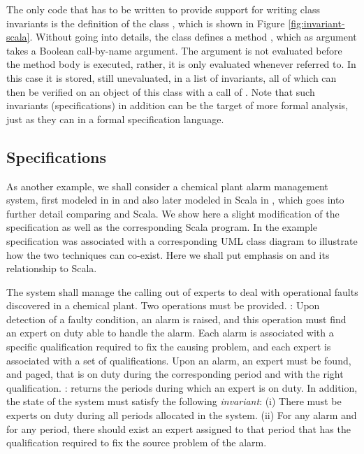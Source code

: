 The only code that has to be written to provide support for 
writing
class invariants is the definition of the class , 
which is shown in Figure \ref{fig:invariant-scala}. Without going 
into details, the class defines a method ,
which as argument takes a Boolean call-by-name argument. 
The argument is not evaluated before the method body is executed, 
rather, it is only evaluated whenever referred to. In this case
it is stored, still unevaluated, in a list of invariants, all
of which can then be verified on an object of this class 
with a call of . Note that such invariants
(specifications) in addition can be the target of more formal analysis, just as they can in a formal specification language.


\subsection{\vdmpp{} Specifications}
\label{sec:vdm-in-scala}

As another example, we shall consider a chemical plant alarm 
management system, first modeled in \vdmpp{} in 
\cite{vdmplusplus05} and also later modeled in Scala in 
\cite{havelund-scala-vdm-12}, which goes into further detail comparing \vdmpp{} and Scala. We show here a slight modification of 
the \vdmpp{} specification as well as the 
corresponding Scala program. In \cite{vdmplusplus05}
the example specification was associated with 
a corresponding UML class diagram to illustrate how the two
techniques can co-exist. Here we shall put emphasis on
\vdmpp{} and its relationship to Scala.

The system shall manage the calling out of experts to deal with 
operational faults discovered in a 
chemical plant. 
Two operations must be provided.
: Upon detection of a faulty condition, an 
alarm is raised, and this operation must find an expert on duty 
able to handle the alarm. Each alarm is associated with a specific 
qualification required to fix the causing
problem, and each expert is associated with a set of 
qualifications. Upon an alarm, an expert must be found, and paged, 
that is on duty during the corresponding period and with the right 
qualification.    
: returns the periods during 
which an expert is on duty.      
In addition, the state of the system must satisfy the following
{\em invariant}:
(i) There must be experts on duty during all periods 
allocated in the system. 
(ii) For any alarm and for any period, there should exist an 
expert assigned to that period that has the qualification required
to fix the source problem of the alarm.

